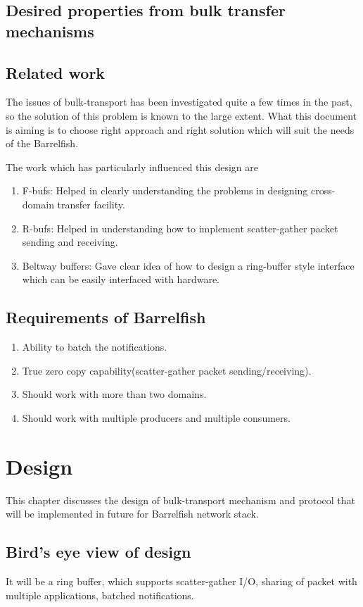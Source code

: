 \documentclass[a4paper,twoside]{report} %
\begin{document}
\section{Desired properties from bulk transfer mechanisms}

\section{Related work}
The issues of bulk-transport has been investigated quite a few times
in the past, so the solution of this problem is known to the large
extent.  What this document is aiming is to choose right approach and
right solution which will suit the needs of the Barrelfish.


The work which has particularly influenced this design are
\begin{enumerate}
  \item F-bufs: Helped in clearly understanding the problems in
  designing cross-domain transfer facility.
  \item R-bufs: Helped in understanding how to implement
  scatter-gather packet sending and receiving.
  \item Beltway buffers: Gave clear idea of how to design a
  ring-buffer style interface which can be easily interfaced with
  hardware. 
\end{enumerate}

\section{Requirements of Barrelfish}

\begin{enumerate}
  \item Ability to batch the notifications.
  \item True zero copy capability(scatter-gather packet
  sending/receiving).
  \item Should work with more than two domains.
  \item Should work with multiple producers and multiple consumers.
\end{enumerate}

\chapter{Design}
This chapter discusses the design of bulk-transport mechanism and
protocol that will be implemented in future for Barrelfish network
stack.


\section{Bird's eye view of design}
It will be a ring buffer, which supports scatter-gather I/O, sharing
of packet with multiple applications, batched notifications.
\end{document}
